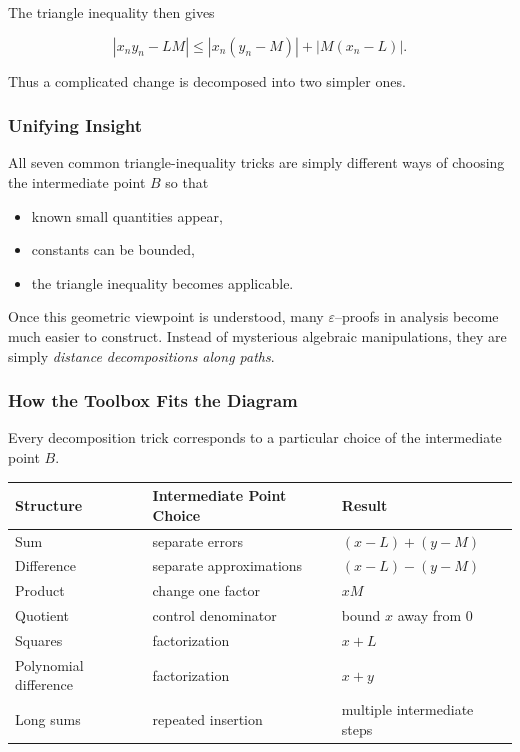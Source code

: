 The triangle inequality then gives

\[
|x_n y_n - LM|
\le
|x_n(y_n-M)| + |M(x_n-L)|.
\]

Thus a complicated change is decomposed into two simpler ones.

\bigskip

\subsubsection*{Unifying Insight}

All seven common triangle-inequality tricks are simply different ways
of choosing the intermediate point \(B\) so that

\begin{itemize}
\item known small quantities appear,
\item constants can be bounded,
\item the triangle inequality becomes applicable.
\end{itemize}

Once this geometric viewpoint is understood, many
$\varepsilon$--proofs in analysis become much easier to construct.
Instead of mysterious algebraic manipulations, they are simply
\emph{distance decompositions along paths}.



\subsubsection*{How the Toolbox Fits the Diagram}

Every decomposition trick corresponds to a particular choice of the
intermediate point \(B\).

\begin{center}
\begin{tabular}{lll}
\toprule
\textbf{Structure} & \textbf{Intermediate Point Choice} & \textbf{Result} \\
\midrule
Sum & separate errors &
\((x-L)+(y-M)\) \\

Difference & separate approximations &
\((x-L)-(y-M)\) \\

Product & change one factor &
\(xM\) \\

Quotient & control denominator &
bound \(x\) away from \(0\) \\

Squares & factorization &
\(x+L\) \\

Polynomial difference & factorization &
\(x+y\) \\

Long sums & repeated insertion &
multiple intermediate steps \\
\bottomrule
\end{tabular}
\end{center}

